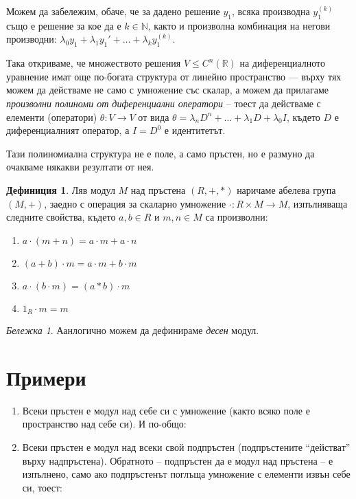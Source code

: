 \documentclass{article}
\newif\ifusemulticols
\theoremstyle{definition}
\newtheorem{deff}{Дефиниция}
\theoremstyle{remark}
\newtheorem*{note}{Бележка}
\theoremstyle{plain}
\theoremstyle{plain}
\newenvironment{mymulticols}
    { \ifusemulticols \begin{multicols}{2} \fi }
    { \ifusemulticols \end{multicols} \fi }
\newcommand{\N}{\mathbb{N}}
\begin{document}
\begin{mymulticols}
\begin{enumerate}
        Можем да забележим, обаче, че за дадено решение $y_1$, всяка производна $y_1^{(k)}$ също е
        решение за кое да е $k \in \N$, както и произволна комбинация на негови производни:
        $\lambda_0 y_1 + \lambda_1 y_1' + \ldots + \lambda_k y_1^{(k)}$.

        Така откриваме, че множеството решения $V \le C^n(\mathbb R)$ на диференциалното уравнение
        имат още по-богата структура от линейно пространство --- върху тях можем да действаме не
        само с умножение със скалар, а можем да прилагаме \emph{произволни полиноми от диференциални
        оператори} -- тоест да действаме с елементи (оператори) $\theta : V \to V$ от вида $\theta =
        \lambda_n D^n + \ldots + \lambda_1 D + \lambda_0 I$, където $D$ е диференциалният оператор,
        а $I = D^0$ е идентитетът.

        Тази полиномиална структура не е поле, а само пръстен, но е размуно да очакваме някакви
        резултати от нея.
\end{enumerate}

\begin{deff}
    Ляв модул $M$ над пръстена $(R, +, *)$ наричаме абелева група $(M, +)$, заедно с операция за скаларно умножение ${\cdot : R \times M \to M}$, изпълняваща следните свойства, където $a, b \in R$ и $m, n \in M$ са произволни:
    \begin{enumerate}
        \item $a \cdot (m+n) = a\cdot m + a\cdot n$
        \item $(a+b)\cdot m = a\cdot m + b \cdot m$
        \item $a \cdot (b\cdot m) = (a * b) \cdot m$
        \item $1_R \cdot m = m$
    \end{enumerate}
\end{deff}

\begin{note}
    Аанлогично можем да дефинираме \textit{десен} модул.
\end{note}

\section{Примери}
\begin{enumerate}
    \item Всеки пръстен е модул над себе си с умножение (както всяко поле е пространство над себе
        си). И по-общо:

    \item Всеки пръстен е модул над всеки свой подпръстен (подпръстените ``действат'' върху
        надпръстена). Обратното -- подпръстен да е модул над пръстена -- е изпълнено, само ако
        подпръстенът поглъща умножение с елементи извън себе си, тоест:


\end{enumerate}
\end{mymulticols}
\end{document}
